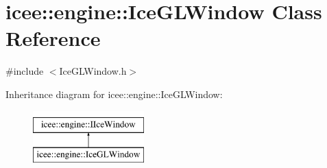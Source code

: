 \hypertarget{classicee_1_1engine_1_1IceGLWindow}{
\section{icee::engine::IceGLWindow Class Reference}
\label{classicee_1_1engine_1_1IceGLWindow}
}


{\ttfamily \#include $<$IceGLWindow.h$>$}

Inheritance diagram for icee::engine::IceGLWindow:\begin{figure}[H]
\begin{center}
\leavevmode
\includegraphics[height=2.000000cm]{classicee_1_1engine_1_1IceGLWindow}
\end{center}
\end{figure}

